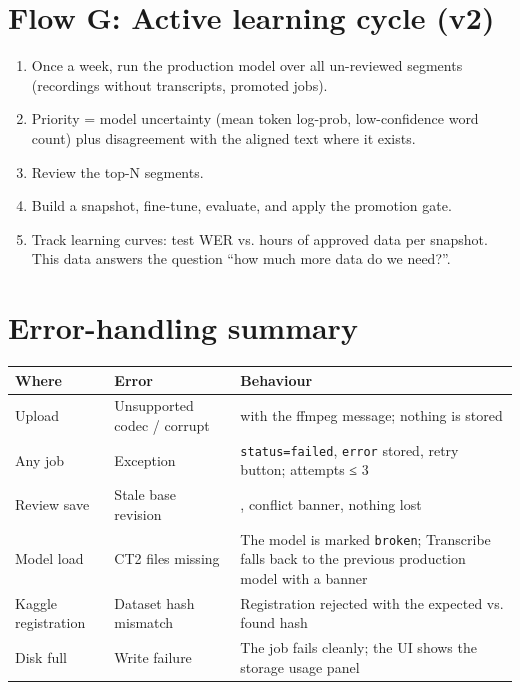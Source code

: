 \documentclass[11pt]{article}
\begin{document}
\hypertarget{flow-g-active-learning-cycle-v2}{%
\section{Flow G: Active learning cycle (v2)}\label{flow-g-active-learning-cycle-v2}}

\begin{enumerate}
\def\labelenumi{\arabic{enumi}.}
\tightlist
\item
  Once a week, run the production model over all un-reviewed segments (recordings without transcripts, promoted jobs).
\item
  Priority = model uncertainty (mean token log-prob, low-confidence word count) plus disagreement with the aligned text where it exists.
\item
  Review the top-N segments.
\item
  Build a snapshot, fine-tune, evaluate, and apply the promotion gate.
\item
  Track learning curves: test WER vs. hours of approved data per snapshot. This data answers the question ``how much more data do we need?''.
\end{enumerate}

\hypertarget{error-handling-summary}{%
\section{Error-handling summary}\label{error-handling-summary}}

\begin{longtable}[]{@{}>{\raggedright\arraybackslash}p{}>{\raggedright\arraybackslash}p{}>{\raggedright\arraybackslash}p{}@{}}
\toprule\noalign{}
Where & Error & Behaviour \\
\midrule\noalign{}
\endhead
\bottomrule\noalign{}
\endlastfoot
Upload & Unsupported codec / corrupt & 422 with the ffmpeg message; nothing is stored \\
Any job & Exception & \texttt{status=\allowbreak{}failed}, \texttt{error} stored, retry button; attempts ≤ 3 \\
Review save & Stale base revision & 409, conflict banner, nothing lost \\
Model load & CT2 files missing & The model is marked \texttt{broken}; Transcribe falls back to the previous production model with a banner \\
Kaggle registration & Dataset hash mismatch & Registration rejected with the expected vs. found hash \\
Disk full & Write failure & The job fails cleanly; the UI shows the storage usage panel \\
\end{longtable}
\end{document}

